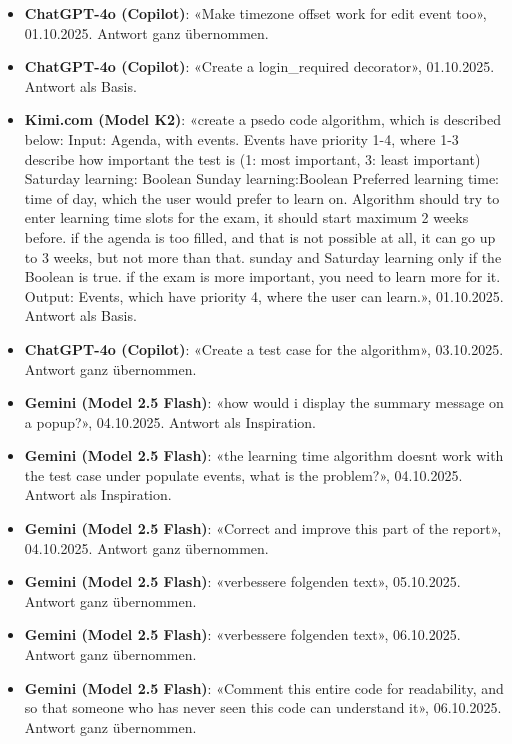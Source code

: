 \documentclass[12pt, a4paper]{article}
\begin{document}
\begin{itemize}
    \item \textbf{ChatGPT-4o (Copilot)}: «Make timezone offset work for edit event too», 01.10.2025. Antwort ganz übernommen.
    
    \item \textbf{ChatGPT-4o (Copilot)}: «Create a login\_required decorator», 01.10.2025. Antwort als Basis.
    
    \item \textbf{Kimi.com (Model K2)}: «create a psedo code algorithm, which is described below: Input: Agenda, with events. Events have priority 1-4, where 1-3 describe how important the test is (1: most important, 3: least important) Saturday learning: Boolean Sunday learning:Boolean Preferred learning time: time of day, which the user would prefer to learn on. Algorithm should try to enter learning time slots for the exam, it should start maximum 2 weeks before. if the agenda is too filled, and that is not possible at all, it can go up to 3 weeks, but not more than that. sunday and Saturday learning only if the Boolean is true. if the exam is more important, you need to learn more for it. Output: Events, which have priority 4, where the user can learn.», 01.10.2025. Antwort als Basis.
    
    \item \textbf{ChatGPT-4o (Copilot)}: «Create a test case for the algorithm», 03.10.2025. Antwort ganz übernommen.
    
    \item \textbf{Gemini (Model 2.5 Flash)}: «how would i display the summary message on a popup?», 04.10.2025. Antwort als Inspiration.
    
    \item \textbf{Gemini (Model 2.5 Flash)}: «the learning time algorithm doesnt work with the test case under populate events, what is the problem?», 04.10.2025. Antwort als Inspiration.
    
    \item \textbf{Gemini (Model 2.5 Flash)}: «Correct and improve this part of the report», 04.10.2025. Antwort ganz übernommen.
    
    \item \textbf{Gemini (Model 2.5 Flash)}: «verbessere folgenden text», 05.10.2025. Antwort ganz übernommen.
    
    \item \textbf{Gemini (Model 2.5 Flash)}: «verbessere folgenden text», 06.10.2025. Antwort ganz übernommen.
    
    \item \textbf{Gemini (Model 2.5 Flash)}: «Comment this entire code for readability, and so that someone who has never seen this code can understand it», 06.10.2025. Antwort ganz übernommen.
    

\end{itemize}
\end{document}
